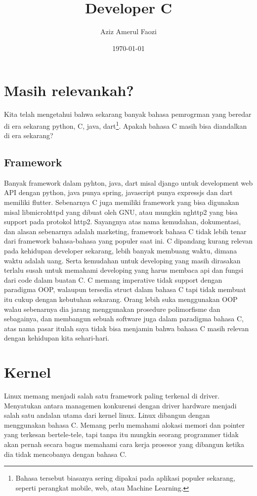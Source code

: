 \documentclass[11pt]{article}
\author{Aziz Amerul Faozi}
\date{\today}
\title{Developer C}
\begin{document}
\maketitle
\tableofcontents


\section{Masih relevankah?}
\label{sec:org5e289c6}
Kita telah mengetahui bahwa sekarang banyak bahasa pemrogrman yang beredar di 
era sekarang python, C, java, dart\footnote{Bahasa tersebut biasanya sering dipakai pada aplikasi populer sekarang, 
seperti perangkat mobile, web, atau Machine Learning.}. Apakah bahasa C masih bisa diandalkan di
era sekarang?
\subsection{Framework}
\label{sec:org8dab84c}
Banyak framework dalam pyhton, java, dart misal django untuk development web API 
dengan python, java punya spring, javascript punya expressjs dan dart memiliki
flutter. Sebenarnya C juga memiliki framework yang bisa digunakan misal 
libmicrohttpd yang dibuat oleh GNU, atau mungkin nghttp2 yang bisa support 
pada protokol http2. Sayangnya atas nama kemudahan, dokumentasi, dan alasan
sebenarnya adalah marketing, framework bahasa C tidak lebih tenar dari framework
bahasa-bahasa yang populer saat ini. C dipandang kurang relevan pada kehidupan
developer sekarang, lebih banyak membuang waktu, dimana waktu adalah uang.
Serta kemudahan untuk developing yang masih dirasakan terlalu susah untuk 
memahami developing yang harus membaca api dan fungsi dari code dalam buatan C.
C memang imperative tidak support dengan paradigma OOP, walaupun tersedia struct
dalam bahasa C tapi tidak membuat itu cukup dengan kebutuhan sekarang. 
Orang lebih suka menggunakan OOP walau sebenarnya dia jarang menggunakan 
prosedure polimorfisme dan sebagainya, dan membangun sebuah software juga dalam 
paradigma bahasa C, atas nama pasar itulah saya tidak bisa menjamin bahwa 
bahasa C masih relevan dengan kehidupan kita sehari-hari.

\section{Kernel}
\label{sec:orgb17fca7}
Linux memang menjadi salah satu framework paling terkenal di driver. 
Menyatukan antara managemen konkurensi dengan driver hardware menjadi salah
satu andalan utama dari kernel linux. Linux dibangun dengan menggunakan bahasa C.
Memang perlu memahami alokasi memori dan pointer yang terkesan bertele-tele, tapi
tanpa itu mungkin seorang programmer tidak akan pernah secara bagus memahami
cara kerja prosesor yang dibangun ketika dia tidak mencobanya dengan bahasa C.
\end{document}
